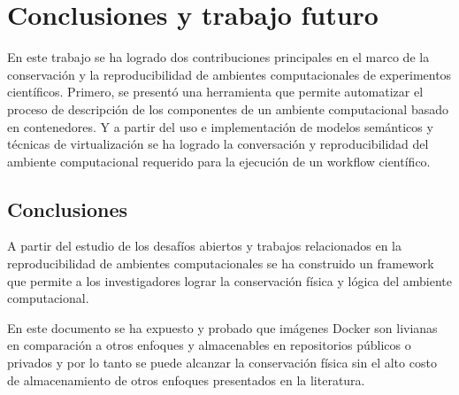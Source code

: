 
\chapter{Conclusiones y trabajo futuro} %


%
%

En este trabajo se ha logrado dos contribuciones principales en el marco de la conservación y la reproducibilidad de ambientes computacionales de experimentos científicos. 
Primero, se presentó una herramienta que permite automatizar el proceso de descripción de los componentes de un ambiente computacional basado en contenedores.
Y a partir del uso e implementación de modelos semánticos y 
técnicas de virtualización se ha logrado la conversación y reproducibilidad del ambiente computacional requerido para la ejecución de un workflow  científico.

\section{Conclusiones}

A partir del estudio de los desafíos abiertos y trabajos 
relacionados en la reproducibilidad de ambientes computacionales se ha construido un framework que permite a los investigadores lograr la conservación física y lógica del ambiente computacional.

En este documento se ha expuesto y probado que imágenes Docker son 
livianas en comparación a otros enfoques y almacenables en repositorios públicos o privados y por lo tanto se puede alcanzar la conservación física sin el alto costo de almacenamiento de otros enfoques presentados en la literatura.

